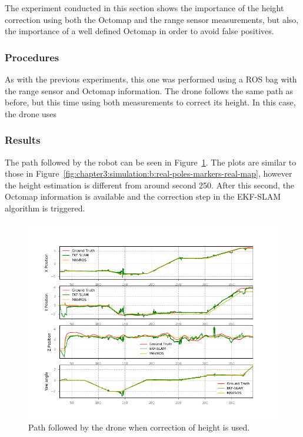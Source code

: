 The experiment conducted in this section shows the importance of the height correction using both the Octomap and the range sensor measurements, but also, the importance of a well defined Octomap in order to avoid false positives.

\subsubsection{Procedures}
\label{subsubsec:chapter3:simulation:c:procedures}
As with the previous experiments, this one was performed using a \ac{ROS} bag with the range sensor and Octomap information. The drone follows the same path as before, but this time using both measurements to correct its height. In this case, the drone uses

\subsubsection{Results}
\label{subsubsec:chapter3:simulation:c:results}
The path followed by the robot can be seen in Figure~\ref{fig:chapter3:simulation:c:path-w-range}. The plots are similar to those in Figure~\ref{fig:chapter3:simulation:b:real-poles-markers-real-map}, however the height estimation is different from around second 250. After this second, the Octomap information is available and the correction step in the EKF-SLAM algorithm is triggered.\\
\begin{figure}[h]
    \centering
    \includegraphics[width=\textwidth]{Images/fig23-path-w-laser.png}
    \caption{Path followed by the drone when correction of height is used.}
    \label{fig:chapter3:simulation:c:path-w-range}
\end{figure}


